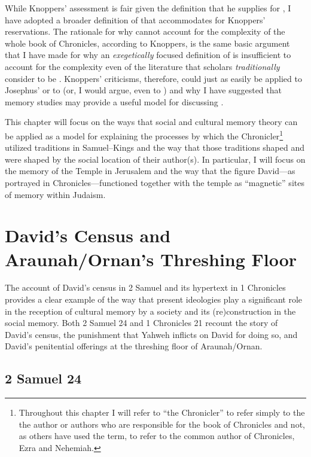 While Knoppers' assessment is fair given the definition that he supplies
for \rwb, I have adopted a broader definition of
\rwb that accommodates for Knoppers' reservations. The
rationale for why \rwb cannot account for the complexity
of the whole book of Chronicles, according to Knoppers, is the same
basic argument that I have made for why an \emph{exegetically} focused
definition of \rwb is insufficient to account for the
complexity even of the literature that scholars \emph{traditionally}
consider to be \rwb. Knoppers' criticisms, therefore,
could just as easily be applied to Josephus' \ant or to
\jub (or, I would argue, even to \ga)
and why I have suggested that memory studies may provide a useful model
for discussing \rwb.

This chapter will focus on the ways that social and cultural memory
theory can be applied as a model for explaining the processes by which
the Chronicler\footnote{Throughout this chapter I will refer to ``the
  Chronicler'' to refer simply to the the author or authors who are
  responsible for the book of Chronicles and not, as others have used
  the term, to refer to the common author of Chronicles, Ezra and
  Nehemiah.} utilized traditions in Samuel--Kings and the way that those
traditions shaped and were shaped by the social location of their
author(s). In particular, I will focus on the memory of the Temple in
Jerusalem and the way that the figure David---as portrayed in
Chronicles---functioned together with the temple as ``magnetic'' sites
of memory within \secondtemple
Judaism.\autocite[73]{benzvi_st2017}

\hypertarget{davids-census-and-araunahornans-threshing-floor}{%
\section{David's Census and Araunah/Ornan's Threshing
Floor}\label{davids-census-and-araunahornans-threshing-floor}}

The account of David's census in 2 Samuel and its hypertext in 1
Chronicles provides a clear example of the way that present ideologies
play a significant role in the reception of cultural memory by a society
and its (re)construction in the social memory. Both 2 Samuel 24 and 1
Chronicles 21 recount the story of David's census, the punishment that
Yahweh inflicts on David for doing so, and David's penitential offerings
at the threshing floor of Araunah/Ornan.

\hypertarget{samuel-24}{%
\subsection{2 Samuel 24}\label{samuel-24}}

